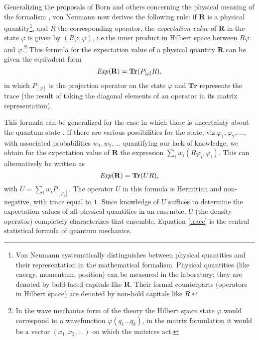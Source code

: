 \documentclass[12pt]{article}
\begin{document}
Generalizing the proposals of Born and others concerning the physical meaning of the formalism \cite[III.1]{VN1}, von Neumann now derives the following rule: if $\textbf{R}$ is a physical quantity\footnote{Von Neumann systematically distinguishes between physical quantities and their representation in the mathematical formalism. Physical quantities (like energy, momentum, position) can be measured in the laboratory; they are denoted by bold-faced capitals like $\textbf{R}$. Their formal counterparts (operators in Hilbert space) are denoted by non-bold capitals like $R$.}, and $R$ the corresponding operator, the \emph{expectation value} of $\textbf{R}$ in the state $\varphi$ is given by $(R\varphi, \varphi)$, i.e.\@ the inner product in Hilbert space between $R\varphi$ and $\varphi$.\footnote{In the wave mechanics form of the theory the Hilbert space state $\varphi$ would correspond to a wavefunction $\varphi(q_1...q_k)$, in the matrix formulation it would be a vector $(x_1, x_2,...)$ on which the matrices act.} This formula for the expectation value of a physical quantity $\textbf{R}$ can be given the equivalent form
\begin{equation*}
  {\it Exp}(\textbf{R}) = \textbf{Tr}(P_{[\varphi]}R),
\end{equation*}
in which $P_{[\varphi]}$ is the projection operator on the state $\varphi$ and $\textbf{Tr}$ represents the trace (the result of taking the diagonal elements of an operator in its matrix representation).

This formula can be generalized for the case in which there is uncertainty about the quantum state \cite[pp.\@ 157--158]{VN1}. If there are various possibilities for the state, viz.\@ $\varphi_1, \varphi_2, ...$, with associated probabilities $w_1, w_2, ...$ quantifying our lack of knowledge, we obtain for the expectation value of $\textbf{R}$ the expression $\sum_i w_i (R\varphi_i, \varphi_i)$. This can alternatively be written as
\begin{equation}\label{trace}
 {\it Exp}(\textbf{R}) = \textbf{Tr} (U R),
\end{equation}
with $ U = \sum_i w_i P_{[\varphi_i]}$. The operator $U$ in this formula is Hermitian and non-negative, with trace equal to $1$. Since knowledge of $U$ suffices to determine the expectation values of all physical quantities in an ensemble, $U$ (the density operator) completely characterizes that ensemble. Equation \ref{trace} is the central statistical formula of quantum mechanics.
\end{document}
